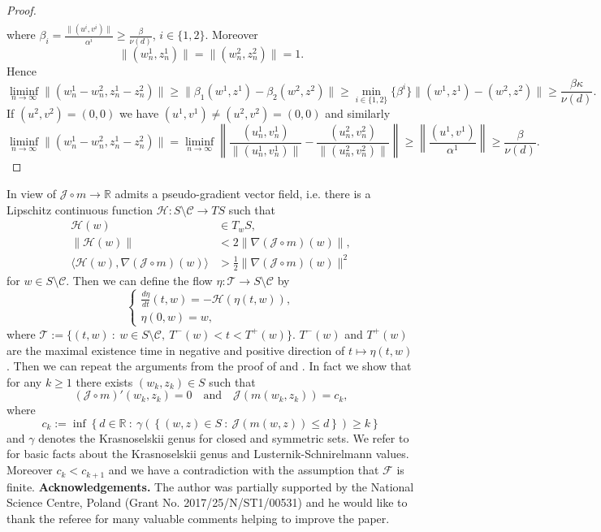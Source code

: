 \documentclass{scrartcl}
\newcommand{\cH}{{\mathcal H}}
\newcommand{\cJ}{{\mathcal J}}
\newcommand{\cT}{{\mathcal T}}
\newcommand{\R}{\mathbb{R}}
\numberwithin{equation}{section}
\begin{document}
\begin{proof}
\begin{align*}
\end{align*}
where $ \beta_i = \frac{\|(u^i,v^i)\|}{\alpha^i} \geq \frac{\beta}{\nu (d)}$, $i\in \{1,2\}$. Moreover
$$
\| (w_n^1, z_n^1) \| = \| (w_n^2, z_n^2) \| = 1.
$$
Hence
$$
\liminf_{n\to\infty} \| (w_n^1-w_n^2, z_n^1-z_n^2) \| \geq \| \beta_1 (w^1, z^1) - \beta_2 (w^2, z^2) \| \geq \min_{i \in \{1,2\}} \{ \beta^i \}  \| (w^1, z^1) - (w^2, z^2) \| \geq \frac{\beta \kappa}{\nu (d)}.
$$
If $(u^2, v^2) = (0,0)$ we have $(u^1, v^1) \neq (u^2, v^2) = (0,0)$ and similarly
$$
\liminf_{n\to\infty} \| (w_n^1-w_n^2, z_n^1-z_n^2) \| = \liminf_{n\to\infty} \left\| \frac{(u_n^1,v_n^1)}{\|(u_n^1,v_n^1)\|} - \frac{(u_n^2,v_n^2)}{\|(u_n^2,v_n^2)\|} \right\| \geq \left\| \frac{(u^1,v^1)}{\alpha^1} \right\| \geq \frac{\beta}{\nu(d)}.
$$
\end{proof}

In view of \cite[Lemma II.3.9]{Struwe} $\cJ \circ m \rightarrow \R$ admits a pseudo-gradient vector field, i.e. there is a Lipschitz continuous function $\cH : S \setminus \mathscr{C} \rightarrow T S$ such that
\begin{align*}
\cH (w) &\in T_w S, \\
\| \cH (w) \| &< 2 \| \nabla (\cJ \circ m)(w) \|, \\
\langle \mathcal{H}(w), \nabla  (\cJ \circ m)(w) \rangle &> \frac{1}{2} \| \nabla (\cJ \circ m)(w) \|^2
\end{align*}
for $w \in S \setminus \mathscr{C}$. Then we can define the flow $\eta : \cT \rightarrow S \setminus \mathscr{C}$ by
$$
\left\{ \begin{array}{l}
\frac{d \eta}{dt}(t,w) = - \mathcal{H}(\eta(t,w)), \\
\eta (0,w) = w ,
\end{array} \right.
$$
where $\cT := \{ (t,w) \ : \ w \in S \setminus \mathscr{C}, \ T^{-}(w) < t < T^+ (w) \}$. $T^-(w)$ and $T^+(w)$ are the maximal existence time in negative and positive direction of $t \mapsto \eta (t,w)$. Then we can repeat the arguments from the proof of \cite[Theorem 1.2]{SzulkinWeth} and \cite[Theorem 1.2]{Bieganowski}. In fact we show that for any $k \geq 1$ there exists $(w_k,z_k) \in S$ such that
$$
(\cJ \circ m)' (w_k, z_k) = 0 \quad \mbox{and} \quad \cJ ( m (w_k, z_k) ) = c_k,
$$
where
$$
c_k := \inf \left\{ d \in \R \ : \ \gamma \left( \left\{ \left( w,z \right) \in S \ : \ \cJ \left( m \left( w,z \right) \right) \leq d \right\} \right) \geq k \right\}
$$
and $\gamma$ denotes the Krasnoselskii genus for closed and symmetric sets. We refer to \cite{Struwe} for basic facts about the Krasnoselskii genus and Lusternik-Schnirelmann values. Moreover $c_k < c_{k+1}$ and we have a contradiction with the assumption that $\mathcal{F}$ is finite.
\newline
\newline
\textbf{Acknowledgements.} The author was partially supported by the National Science Centre, Poland (Grant No. 2017/25/N/ST1/00531) and he would like to thank the referee for many valuable comments helping to improve the paper.
\end{document}
